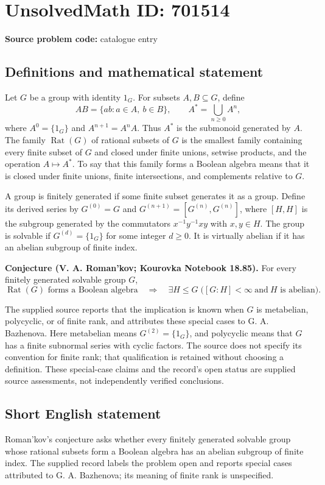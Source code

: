 \documentclass[11pt]{article}
\begin{document}
\section*{UnsolvedMath ID: 701514}
\textbf{Source problem code:} catalogue entry
\subsection{Definitions and mathematical statement}
Let \(G\) be a group with identity \(1_G\). For subsets \(A,B\subseteq G\), define
\[
AB=\{ab:a\in A,\ b\in B\},\qquad A^*=\bigcup_{n\geq 0}A^n,
\]
where \(A^0=\{1_G\}\) and \(A^{n+1}=A^nA\). Thus \(A^*\) is the submonoid generated by \(A\). The family \(\operatorname{Rat}(G)\) of rational subsets of \(G\) is the smallest family containing every finite subset of \(G\) and closed under finite unions, setwise products, and the operation \(A\mapsto A^*\). To say that this family forms a Boolean algebra means that it is closed under finite unions, finite intersections, and complements relative to \(G\).

A group is finitely generated if some finite subset generates it as a group. Define its derived series by \(G^{(0)}=G\) and \(G^{(n+1)}=[G^{(n)},G^{(n)}]\), where \([H,H]\) is the subgroup generated by the commutators \(x^{-1}y^{-1}xy\) with \(x,y\in H\). The group is solvable if \(G^{(d)}=\{1_G\}\) for some integer \(d\geq 0\). It is virtually abelian if it has an abelian subgroup of finite index.

\textbf{Conjecture (V. A. Roman'kov; Kourovka Notebook 18.85).} For every finitely generated solvable group \(G\),
\[
\operatorname{Rat}(G)\text{ forms a Boolean algebra}
\quad\Longrightarrow\quad
\exists H\leq G\;\bigl([G:H]<\infty\ \text{and}\ H\text{ is abelian}\bigr).
\]

The supplied source reports that the implication is known when \(G\) is metabelian, polycyclic, or of finite rank, and attributes these special cases to G. A. Bazhenova. Here metabelian means \(G^{(2)}=\{1_G\}\), and polycyclic means that \(G\) has a finite subnormal series with cyclic factors. The source does not specify its convention for finite rank; that qualification is retained without choosing a definition. These special-case claims and the record's open status are supplied source assessments, not independently verified conclusions.
\subsection{Short English statement}
Roman'kov's conjecture asks whether every finitely generated solvable group whose rational subsets form a Boolean algebra has an abelian subgroup of finite index. The supplied record labels the problem open and reports special cases attributed to G. A. Bazhenova; its meaning of finite rank is unspecified.
\end{document}
